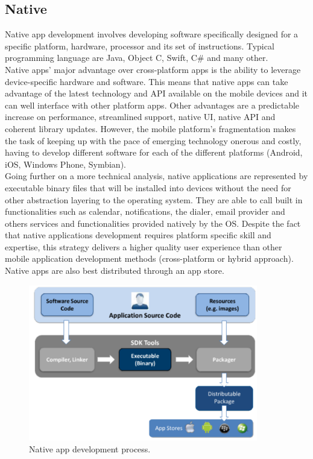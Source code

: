 \subsection{Native}
Native app development involves developing software specifically designed for a specific platform, hardware, processor and its set of instructions. Typical programming language are  Java, Object C,  Swift, C\# and many other.\\
Native apps’ major advantage over cross-platform apps is the ability to leverage device-specific hardware and software. This means that native apps can take advantage of the latest technology and API available on the mobile devices and it can well interface with other platform apps. Other advantages are a predictable increase on performance, streamlined support, native UI, native API and coherent library updates. However, the mobile platform’s fragmentation makes the task of keeping up with the pace of emerging technology onerous and costly, having to develop different software for each of the different platforms (Android, iOS, Windows Phone, Symbian).\\
Going further on a more technical analysis, native applications are represented by  executable binary files that will be installed into devices without the need for other abstraction layering to the operating system. They are able to call built in functionalities such as calendar, notifications, the dialer, email provider and others services and functionalities provided natively by the OS. Despite the fact that native applications development requires platform specific skill and expertise, this strategy delivers a higher quality user experience than other mobile application development methods (cross-platform or hybrid approach). Native apps are also best distributed through an app store.\cite{ref8}
\begin{figure}[ht!]
	\centering
	\includegraphics[width=100mm]{figures/ch6/2.png}
	\caption{Native app development process.}
	\label{fig6.2}
\end{figure}

